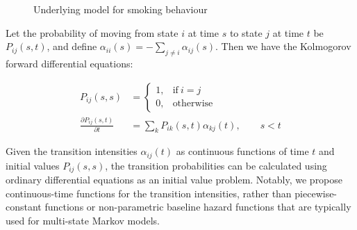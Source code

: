 \documentclass[11pt,a4paper]{article}
\begin{document}
\begin{figure}[h]
\begin{center}
\end{center}
  \caption{Underlying model for smoking behaviour}
  \label{fig:baseline}
\end{figure}

Let the probability of moving from state $i$ at time $s$ to state $j$
at time $t$ be $P_{ij}(s,t)$, and define
$\alpha_{ii}(s)=-\sum_{j\neq i} \alpha_{ij}(s)$. Then we have the
Kolmogorov forward differential equations:

\begin{align*}
  P_{ij}(s,s) &= \begin{cases}
    1, & \text{if}\ i=j \\
    0, & \text{otherwise}
  \end{cases} \\
  \frac{\partial P_{ij}(s,t)}{\partial t} &= \sum_k P_{ik}(s,t)
  \alpha_{kj}(t), \qquad s<t
\end{align*}

Given the transition intensities $\alpha_{ij}(t)$ as continuous
functions of time $t$ and initial values $P_{ij}(s,s)$, the transition
probabilities can be calculated using ordinary differential equations
as an initial value problem.  Notably, we propose continuous-time
functions for the transition intensities, rather than
piecewise-constant functions or non-parametric baseline hazard
functions that are typically used for multi-state Markov models.
\end{document}
